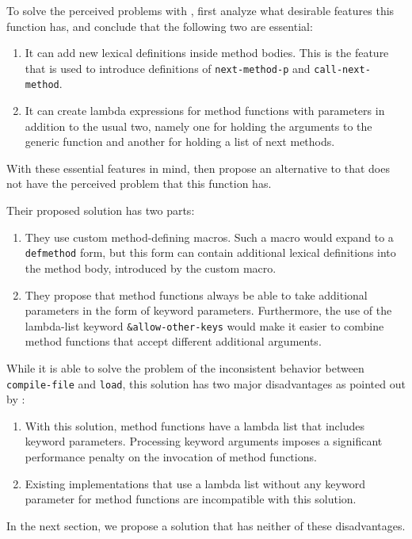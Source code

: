 To solve the perceived problems with \mml{}, \cnh{} first analyze what
desirable features this function has, and conclude that the following
two are essential:

\begin{enumerate}
\item It can add new lexical definitions inside method bodies.  This
  is the feature that is used to introduce definitions of
  \texttt{next-method-p} and \texttt{call-next-method}.
\item It can create lambda expressions for method functions with
  parameters in addition to the usual two, namely one for holding the
  arguments to the generic function and another for holding a list of
  next methods.
\end{enumerate}

With these essential features in mind, \cnh{} then propose an
alternative to \mml{} that does not have the perceived problem that
this function has.

Their proposed solution has two parts:

\begin{enumerate}
\item They use custom method-defining macros.  Such a macro would
  expand to a \texttt{defmethod} form, but this form can contain
  additional lexical definitions into the method body, introduced by
  the custom macro.
\item They propose that method functions always be able to take
  additional parameters in the form of \commonlisp{} keyword
  parameters.  Furthermore, the use of the lambda-list keyword
  \texttt{\&allow-other-keys} would make it easier to combine method
  functions that accept different additional arguments.
\end{enumerate}

While it is able to solve the problem of the inconsistent behavior
between \texttt{compile-file} and \texttt{load}, this solution has two
major disadvantages as pointed out by \cnh{}:

\begin{enumerate}
\item With this solution, method functions have a lambda list that
  includes keyword parameters.  Processing keyword arguments imposes a
  significant performance penalty on the invocation of method
  functions.
\item Existing \clos{} implementations that use a lambda list without
  any keyword parameter for method functions are incompatible with
  this solution.
\end{enumerate}

In the next section, we propose a solution that has neither of these
disadvantages.

